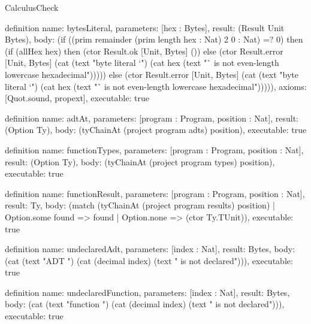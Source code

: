 \begin{lexlean}{CalculusCheck}
\begin{semanticmodule}
definition{
  name: bytesLiteral,
  parameters: [hex : Bytes],
  result: (Result Unit Bytes),
  body: (if ((prim remainder (prim length hex : Nat) 2 0 : Nat) =? 0) then (if (allHex hex) then (ctor Result.ok [Unit, Bytes] ()) else (ctor Result.error [Unit, Bytes] (cat (text "byte literal `") (cat hex (text "` is not even-length lowercase hexadecimal"))))) else (ctor Result.error [Unit, Bytes] (cat (text "byte literal `") (cat hex (text "` is not even-length lowercase hexadecimal"))))),
  axioms: [Quot.sound, propext],
  executable: true
}

definition{
  name: adtAt,
  parameters: [program : Program, position : Nat],
  result: (Option Ty),
  body: (tyChainAt (project program adts) position),
  executable: true
}

definition{
  name: functionTypes,
  parameters: [program : Program, position : Nat],
  result: (Option Ty),
  body: (tyChainAt (project program types) position),
  executable: true
}

definition{
  name: functionResult,
  parameters: [program : Program, position : Nat],
  result: Ty,
  body: (match (tyChainAt (project program results) position)
    | Option.some found => found
    | Option.none => (ctor Ty.TUnit)),
  executable: true
}

definition{
  name: undeclaredAdt,
  parameters: [index : Nat],
  result: Bytes,
  body: (cat (text "ADT ") (cat (decimal index) (text " is not declared"))),
  executable: true
}

definition{
  name: undeclaredFunction,
  parameters: [index : Nat],
  result: Bytes,
  body: (cat (text "function ") (cat (decimal index) (text " is not declared"))),
  executable: true
}


\end{semanticmodule}
\end{lexlean}
